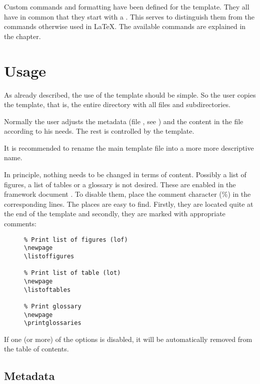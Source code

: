 Custom commands and formatting have been defined for the template. They all
have in common that they start with a .
This serves to distinguish them from the commands otherwise used in \LaTeX{}.
The available commands are explained in the  chapter.

\section{Usage}

As already described, the use of the template should be simple. So the user
copies the template, that is, the entire directory with all files and
subdirectories.
\bigbreak

Normally the user adjusts the metadata (file ,
see ) and the content in the file
 according to his needs. The rest is controlled
by the template.
\bigbreak

It is recommended to rename the main template file 
into a more more descriptive name.


In principle, nothing needs to be changed in terms of content. Possibly a
list of figures, a list of tables or a glossary is not desired. These are
enabled in the framework document . To disable
them, place the comment character (\%) in the corresponding lines. The places
are easy to find. Firstly, they are located quite at the end of the template
and secondly, they are marked with appropriate comments:

\begin{figure}[H]
    \scriptsize
    \centering
    \begin{BVerbatim}
\newpage
\listoffigures

\newpage
\listoftables

\newpage
\printglossaries
    \end{BVerbatim}
\end{figure}

If one (or more) of the options is disabled, it will be automatically removed
from the table of contents.

\subsection{Metadata}
\label{subsec:Metadata}

